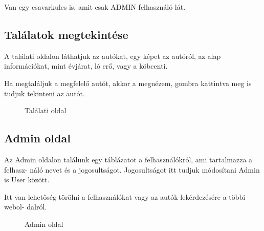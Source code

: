 Van egy csavarkulcs is, amit csak ADMIN felhasználó lát.

\subsection{Találatok megtekintése}

A találati oldalon láthatjuk az autókat, egy képet az autóról, az alap információkat, mint évjárat, ló erő, vagy a köbcenti.

Ha megtaláljuk a megfelelő autót, akkor a megnézem, gombra kattintva meg is tudjuk tekinteni az autót.
\newpage

\begin{figure}[h]
\centering
{}
\caption{Találati oldal}
\label{fig:Talalatok}
\end{figure}

\subsection{Admin oldal}

Az Admin oldalon találunk egy táblázatot a felhasználókról, ami tartalmazza a felhasz-
náló nevet és a jogosultságot. Jogosultságot itt tudjuk módosítani Admin is User között.

Itt van lehetőség törölni a felhasználókat vagy az autók lekérdezésére a többi webol-
dalról.

\begin{figure}[h]
\centering
{}
\caption{Admin oldal}
\label{fig:Admin}
\end{figure}
\newpage

